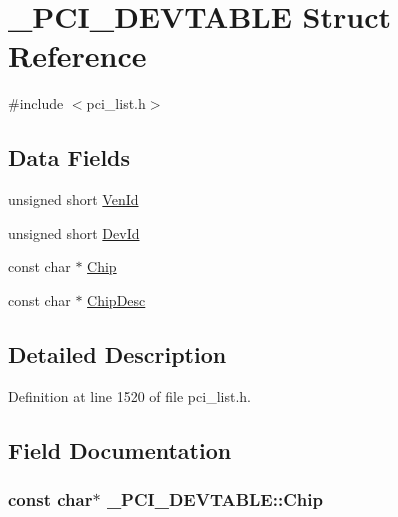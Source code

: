 \hypertarget{struct__PCI__DEVTABLE}{}\section{\+\_\+\+P\+C\+I\+\_\+\+D\+E\+V\+T\+A\+B\+LE Struct Reference}
\label{struct__PCI__DEVTABLE}


{\ttfamily \#include $<$pci\+\_\+list.\+h$>$}

\subsection*{Data Fields}
\begin{DoxyCompactItemize}
\item 
unsigned short \hyperlink{struct__PCI__DEVTABLE_acab5aacfc4cdfc1f3c71e9f835c52a61}{Ven\+Id}
\item 
unsigned short \hyperlink{struct__PCI__DEVTABLE_a843e7019bff5cda0c58a061814dfdbe6}{Dev\+Id}
\item 
const char $\ast$ \hyperlink{struct__PCI__DEVTABLE_afe06a83864adc5504ea8eb4644f6f194}{Chip}
\item 
const char $\ast$ \hyperlink{struct__PCI__DEVTABLE_aa93c23c253df7ff6365b332220f447ec}{Chip\+Desc}
\end{DoxyCompactItemize}


\subsection{Detailed Description}


Definition at line 1520 of file pci\+\_\+list.\+h.



\subsection{Field Documentation}
\subsubsection[{\texorpdfstring{Chip}{Chip}}]{\setlength{\rightskip}{0pt plus 5cm}const char$\ast$ \+\_\+\+P\+C\+I\+\_\+\+D\+E\+V\+T\+A\+B\+L\+E\+::\+Chip}\hypertarget{struct__PCI__DEVTABLE_afe06a83864adc5504ea8eb4644f6f194}{}\label{struct__PCI__DEVTABLE_afe06a83864adc5504ea8eb4644f6f194}


